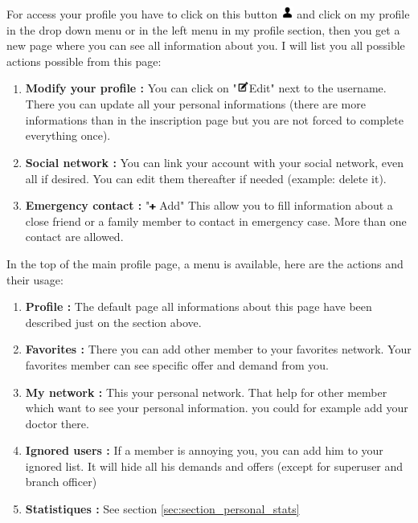 \documentclass[11pt, a4paper]{article}      %
\begin{document}
For access your profile you have to click on this button \includegraphics[width=0.4cm]{user_icon.png} and click on my profile in the drop down menu or in the left menu in my profile section, then you get a new page where you can see all information about you. I will list you all possible actions possible from this page:
\begin{enumerate}
  \item \textbf{Modify your profile :} You can click on "\includegraphics[width=0.4cm]{edit_icon.png}Edit" next to the username. There you can update all your personal informations (there are more informations than in the inscription page but you are not forced to complete everything once).
  \item \textbf{Social network :} You can link your account with your social network, even all if desired. You can edit them thereafter if needed (example: delete it).
  \item \textbf{Emergency contact :} "\includegraphics[width=0.2cm]{plus_icon.png} Add" This allow you to fill information about a close friend or a family member to contact in emergency case. More than one contact are allowed.  
\end{enumerate}
In the top of the main profile page, a menu is available, here are the actions and their usage:
\begin{enumerate}
  \item \textbf{Profile :} The default page all informations about this page have been described just on the section above.
  \item \textbf{Favorites :} There you can add other member to your favorites network. Your favorites member can see specific offer and demand from you.
  \item \textbf{My network :} This your personal network. That help for other member which want to see your personal information. you could for example add your doctor there.
  \item \textbf{Ignored users :} If a member is annoying you, you can add him to your ignored list. It will hide all his demands and offers (except for superuser and branch officer)
  \item \textbf{Statistiques :} See section \ref{sec:section_personal_stats}
\end{enumerate}
\end{document}
